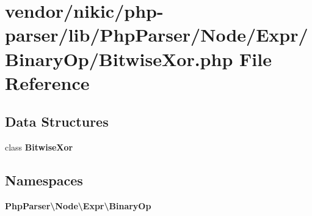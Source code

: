 \section{vendor/nikic/php-\/parser/lib/\+Php\+Parser/\+Node/\+Expr/\+Binary\+Op/\+Bitwise\+Xor.php File Reference}
\label{_binary_op_2_bitwise_xor_8php}
\subsection*{Data Structures}
\begin{DoxyCompactItemize}
\item 
class {\bf Bitwise\+Xor}
\end{DoxyCompactItemize}
\subsection*{Namespaces}
\begin{DoxyCompactItemize}
\item 
 {\bf Php\+Parser\textbackslash{}\+Node\textbackslash{}\+Expr\textbackslash{}\+Binary\+Op}
\end{DoxyCompactItemize}
